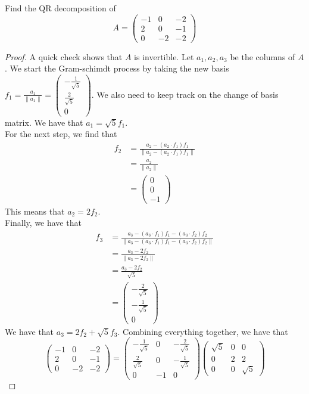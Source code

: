 \documentclass[a4paper]{article}
\begin{document}
\begin{eg}{}{} Find the QR decomposition of $$A=\begin{pmatrix}
-1 & 0 & -2\\
2 & 0 & -1\\
0 & -2 & -2
\end{pmatrix}$$ 
\begin{proof}
A quick check shows that $A$ is invertible. Let $a_1,a_2,a_3$ be the columns of $A$. We start the Gram-schimdt process by taking the new basis $f_1=\frac{a_1}{\|a_1\|}=\begin{pmatrix}-\frac{1}{\sqrt{5}}\\ \frac{2}{\sqrt{5}}\\ 0\end{pmatrix}$. We also need to keep track on the change of basis matrix. We have that $a_1=\sqrt{5}f_1$. \\
For the next step, we find that 
\begin{align*}
f_2&=\frac{a_2-(a_2\cdot f_1)f_1}{\|a_2-(a_2\cdot f_1)f_1\|}\\
&=\frac{a_2}{\|a_2\|}\\
&=\begin{pmatrix} 0\\ 0\\ -1\end{pmatrix}
\end{align*}
This means that $a_2=2f_2$. \\
Finally, we have that 
\begin{align*}
f_3&=\frac{a_3-(a_3\cdot f_1)f_1-(a_3\cdot f_2)f_2}{\|a_3-(a_3\cdot f_1)f_1-(a_3\cdot f_2)f_2\|}\\
&=\frac{a_3-2f_2}{\|a_3-2f_2\|}\\
&=\frac{a_3-2f_2}{\sqrt{5}}\\
&=\begin{pmatrix}-\frac{2}{\sqrt{5}}\\ -\frac{1}{\sqrt{5}}\\ 0\end{pmatrix}
\end{align*}
We have that $a_3=2f_2+\sqrt{5}f_3$. Combining everything together, we have that $$\begin{pmatrix}
-1 & 0 & -2\\
2 & 0 & -1\\
0 & -2 & -2
\end{pmatrix}=\begin{pmatrix}
-\frac{1}{\sqrt{5}} & 0 & -\frac{2}{\sqrt{5}}\\
\frac{2}{\sqrt{5}} & 0 & -\frac{1}{\sqrt{5}}\\
0 & -1 & 0
\end{pmatrix}\begin{pmatrix}
\sqrt{5} & 0 & 0\\
0 & 2 & 2\\
0 & 0 & \sqrt{5}
\end{pmatrix}$$
\end{proof}
\end{eg}
\end{document}
